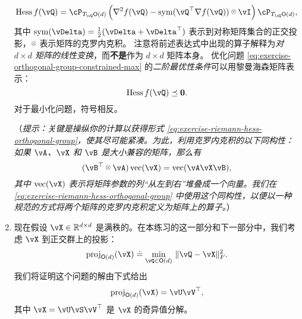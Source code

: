 \documentclass[../../book-main.tex]{subfiles}
\begin{document}
\begin{exercise}
\begin{enumerate}
\begin{equation}
            \mathrm{Hess}\, f(\vQ) = \cP_{T_{\vQ}\O(d)} \left( 
            \nabla^2 f(\vQ) - \Symm(\vQ^\top \nabla f(\vQ)) \kron \vI
            \right) \cP_{T_{\vQ}\O(d)},
        \end{equation}
        其中 $\Symm(\vDelta) = \tfrac{1}{2}(\vDelta + \vDelta^\top)$ 表示到对称矩阵集合的正交投影，$\kron$ 表示矩阵的克罗内克积。
        注意将前述表达式中出现的算子解释为\textit{对 ${d \times d}$ 矩阵的线性变换}，而\textbf{不是}作为 $d \times d$ 矩阵本身。
        优化问题 \eqref{eq:exercise-orthogonal-group-constrained-max} 的\textit{二阶最优性条件}可以用黎曼海森矩阵表示：
        \begin{equation*}
            \mathrm{Hess}\, f(\vQ) \preceq \mathbf{0}.
        \end{equation*}
        对于最小化问题，符号相反。

        （\textit{提示：关键是操纵你的计算以获得形式 \eqref{eq:exercise-riemann-hess-orthogonal-group}，使其尽可能紧凑。为此，利用克罗内克积的以下同构性：如果 $\vA$、$\vX$ 和 $\vB$ 是大小兼容的矩阵，那么有
        \begin{equation*}
            (\vB^\top \kron \vA) \Vec(\vX) = \Vec(\vA \vX \vB),
        \end{equation*}
        其中 $\Vec(\vX)$ 表示将矩阵参数的列“从左到右”堆叠成一个向量。我们在 \eqref{eq:exercise-riemann-hess-orthogonal-group} 中使用这个同构性，以便以一种规范的方式将两个矩阵的克罗内克积定义为矩阵上的算子。}）
        
        \item 现在假设 $\vX \in \R^{d\times d}$ 是满秩的。在本练习的这一部分和下一部分中，我们考虑 $\vX$ 到正交群上的投影：
        \begin{equation}\label{eq:projection-onto-ogrp-defn}
            \mathrm{proj}_{\O(d)}(\vX) \doteq
            \min_{\vQ \in \O(d)
            }\, \norm{\vQ - \vX}_F^2.
        \end{equation}
        我们将证明这个问题的解由下式给出
        \begin{equation*}
            \mathrm{proj}_{\O(d)}(\vX)
            =
            \vU \vV^\top,
        \end{equation*}
        其中 $\vX = \vU \vS \vV^\top$ 是 $\vX$ 的奇异值分解。


\end{enumerate}
\end{exercise}
\end{document}
